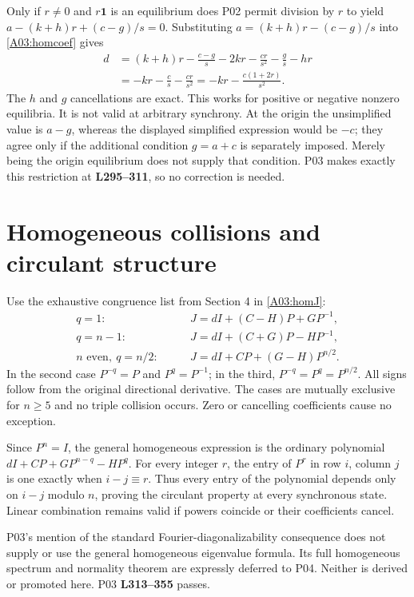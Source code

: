 \documentclass[11pt]{article}
\newcommand{\one}{\mathbf 1}
\newcommand{\lin}[1]{\textbf{L#1}}
\begin{document}
Only if $r\ne0$ and $r\one$ is an equilibrium does P02 permit division by
$r$ to yield $a-(k+h)r+(c-g)/s=0$. Substituting
$a=(k+h)r-(c-g)/s$ into \eqref{A03:homcoef} gives
\begin{align*}
 d&=(k+h)r-\frac{c-g}{s}-2kr-\frac{cr}{s^2}-\frac{g}{s}-hr\\
  &=-kr-\frac{c}{s}-\frac{cr}{s^2}
   =-kr-\frac{c(1+2r)}{s^2}.
\end{align*}
The $h$ and $g$ cancellations are exact. This works for positive or
negative nonzero equilibria. It is not valid at arbitrary synchrony.
At the origin the unsimplified value is $a-g$, whereas the displayed
simplified expression would be $-c$; they agree only if the additional
condition $g=a+c$ is separately imposed. Merely being the origin equilibrium
does not supply that condition. P03 makes exactly this restriction at
\lin{295--311}, so no correction is needed.

\section{Homogeneous collisions and circulant structure}
Use the exhaustive congruence list from Section 4 in \eqref{A03:homJ}:
\begin{align*}
 q=1:&\qquad J=dI+(C-H)P+GP^{-1},\\
 q=n-1:&\qquad J=dI+(C+G)P-HP^{-1},\\
 n\text{ even},\ q=n/2:&\qquad J=dI+CP+(G-H)P^{n/2}.
\end{align*}
In the second case $P^{-q}=P$ and $P^q=P^{-1}$; in the third,
$P^{-q}=P^q=P^{n/2}$. All signs follow from the original directional
derivative. The cases are mutually exclusive for $n\ge5$ and no triple
collision occurs. Zero or cancelling coefficients cause no exception.

Since $P^n=I$, the general homogeneous expression is the ordinary polynomial
$dI+CP+GP^{n-q}-HP^q$. For every integer $r$, the entry of $P^r$ in row
$i$, column $j$ is one exactly when $i-j\equiv r$. Thus every entry of the
polynomial depends only on $i-j$ modulo $n$, proving the circulant property
at every synchronous state. Linear combination remains valid if powers
coincide or their coefficients cancel.

P03's mention of the standard Fourier-diagonalizability consequence does
not supply or use the general homogeneous eigenvalue formula. Its full
homogeneous spectrum and normality theorem are expressly deferred to P04.
Neither is derived or promoted here. P03 \lin{313--355} passes.
\end{document}
